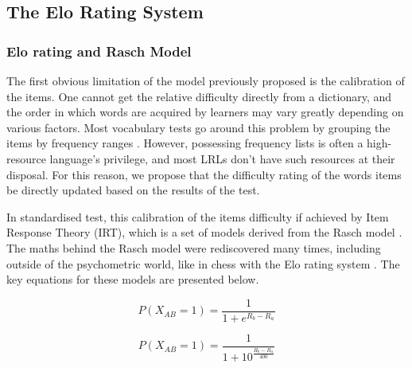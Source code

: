     \subsection{The Elo Rating System}
        \subsubsection{Elo rating and Rasch Model}
The first obvious limitation of the model previously proposed is the calibration of the items. One cannot get the relative difficulty directly from a dictionary, and the order in which words are acquired by learners may vary greatly depending on various factors. Most vocabulary tests go around this problem by grouping the items by frequency ranges \parencite{nation_teaching_1990, meara_complexities_1994, dudley_context-aligned_2024}. However, possessing frequency lists is often a high-resource language's privilege, and most LRLs don't have such resources at their disposal. For this reason, we propose that the difficulty rating of the words items be directly updated based on the results of the test.

In standardised test, this calibration of the items difficulty if achieved by Item Response Theory (IRT), which is a set of models derived from the Rasch model \parencite{rasch_probabilistic_1980}. The maths behind the Rasch model were rediscovered many times, including outside of the psychometric world, like in chess with the Elo rating system \parencite{elo_uscf_1961, elo_rating_1986}. The key equations for these models are presented below.

\begin{figure}[h]
    \centering
    \begin{minipage}{0.45\textwidth}
        \centering
            \[P(X_{AB} = 1)=\frac{1}{1+e^{R_b-R_a}}\]
    \end{minipage}
    \hfill
    \begin{minipage}{0.45\textwidth}
        \centering
            \[P(X_{AB} = 1)=\frac{1}{1+10^{\frac{R_b-R_a}{400}}}\]
    \end{minipage}
\end{figure}\label{Elo}

